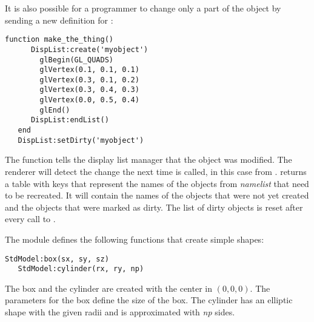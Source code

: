 It is also possible for a programmer to change only a part of the object by
sending a new definition for :

\begin{Verbatim}[fontsize=\scriptsize,gobble=3]
   function make_the_thing()
      DispList:create('myobject')
        glBegin(GL_QUADS)
        glVertex(0.1, 0.1, 0.1)
        glVertex(0.3, 0.1, 0.2)
        glVertex(0.3, 0.4, 0.3)
        glVertex(0.0, 0.5, 0.4)
        glEnd()
      DispList:endList()
   end
   DispList:setDirty('myobject')
\end{Verbatim}

The function  tells the display list manager that the object
was modified. The renderer will detect the change the next time
 is called, in this case from .
 returns a table with keys that represent the names of
the objects from {\em namelist} that need to be recreated. It will contain the
names of the objects that were not yet created and the objects that were marked
as dirty. The list of dirty objects is reset after every call to
.

The module  defines the following functions that create simple shapes:

\begin{Verbatim}[fontsize=\scriptsize,gobble=3]
   StdModel:box(sx, sy, sz)
   StdModel:cylinder(rx, ry, np)
\end{Verbatim}

The box and the cylinder are created with the center in $(0, 0, 0)$. The
parameters for the box define the size of the box. The cylinder has an elliptic
shape with the given radii and is approximated with {\em np} sides.

